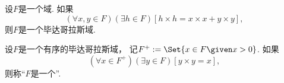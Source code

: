 \begin{theorem}
设\(F\)是一个域.
如果\begin{equation*}
	(\forall x,y \in F)
	(\exists h \in F)
	[
		h \times h
		= x \times x + y \times y
	],
\end{equation*}
则\(F\)是一个毕达哥拉斯域.
\end{theorem}

\begin{definition}
设\(F\)是一个有序的毕达哥拉斯域，
记\(
	F^+
	\defeq
	\Set{
		x \in F
		\given
		x > 0
	}
\).
如果\begin{equation*}
	(\forall x \in F^+)
	(\exists y \in F)
	[
		y \times y = x
	],
\end{equation*}
则称“\(F\)是一个”.
\end{definition}
